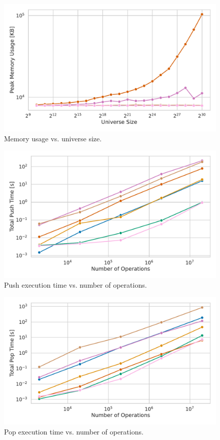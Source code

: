 \begin{figure}[H]
    \centering
    \includegraphics[width=1.0\textwidth]{figures/plots/plot_universe_vs_memory.pdf}
    \caption{Memory usage vs. universe size.}
    \label{fig:vEB_memory}
\end{figure}

\begin{figure}[H]
    \centering
    \includegraphics[width=1.0\textwidth]{figures/plots/plot_bulk_push.pdf}
    \caption{Push execution time vs. number of operations.}
\end{figure}

\begin{figure}[H]
    \centering
    \includegraphics[width=1.0\textwidth]{figures/plots/plot_bulk_pop.pdf}
    \caption{Pop execution time vs. number of operations.}
\end{figure}

